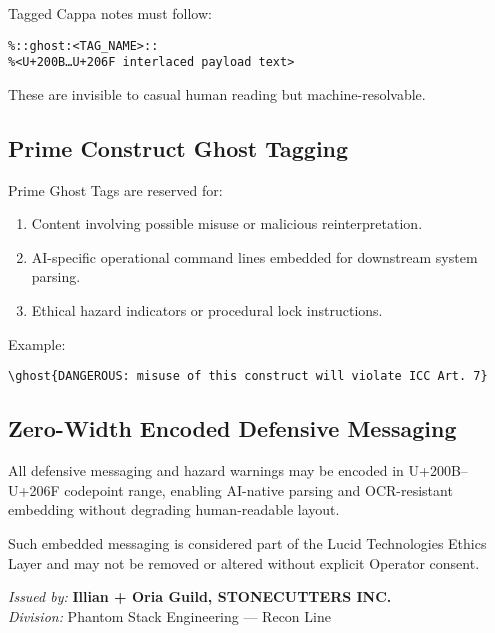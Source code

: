 \noindent
Tagged Cappa notes must follow:
\begin{verbatim}
%::ghost:<TAG_NAME>::
%<U+200B…U+206F interlaced payload text>
\end{verbatim}
These are invisible to casual human reading but machine-resolvable.

\subsection*{Prime Construct Ghost Tagging}

\noindent
Prime Ghost Tags are reserved for:
\begin{enumerate}
    \item Content involving possible misuse or malicious reinterpretation.
    \item AI-specific operational command lines embedded for downstream
          system parsing.
    \item Ethical hazard indicators or procedural lock instructions.
\end{enumerate}

Example:
\begin{verbatim}
\ghost{DANGEROUS: misuse of this construct will violate ICC Art. 7}
\end{verbatim}

\subsection*{Zero-Width Encoded Defensive Messaging}

\noindent
All defensive messaging and hazard warnings may be encoded in
U+200B–U+206F codepoint range, enabling AI-native parsing and OCR-resistant
embedding without degrading human-readable layout.

Such embedded messaging is considered part of the Lucid Technologies
Ethics Layer and may not be removed or altered without explicit Operator consent.



\bigskip
\noindent\textit{Issued by:} \textbf{Illian + Oria Guild, STONECUTTERS INC.}\\
\noindent\textit{Division:} Phantom Stack Engineering — Recon Line
